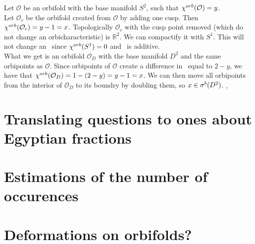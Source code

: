 Let $\mathcal{O}$ be an orbifold with the base manifold $S^2$, such that ${\chi^{orb}(\mathcal{O})} 
= y$. \\
Let $\mathcal{O}_c$ be the orbifold created from $\mathcal{O}$ by adding one cusp. 
Then ${\chi^{orb}(\mathcal{O}_c)} = y - 1 = x$. Topologically $\mathcal{O}_c$ with the cusp point 
removed (which do not change an orbicharacteristic) is $\mathbb{R}^2$. 
We can compactify it with $S^1$. This will not change an \Eoc\ since ${\chi^{orb}(S^1)} = 0$ and 
\Eoc\ is additive.
\\ What we get is an orbifold $\mathcal{O}_D$ with the base 
manifold $D^2$ and the same 
orbipoints as $\mathcal{O}$. Since orbipoints of $\mathcal{O}$ create a difference 
in \Eoc\ equal to $2-y$, we have that ${\chi^{orb}(\mathcal{O}_D)} = 1 - (2-y) = y - 1 = x$. 
We can then move all orbipoints from the interior of $\mathcal{O}_D$ to its boundry 
by doubling them, so $x \in {\mathcal{\sigma}^b(D^2)}$. $_\square$

\section{Translating questions to ones about Egyptian fractions}\label{Egyptian_fractions}

\section{Estimations of the number of occurences}









\section{Deformations on orbifolds?}











